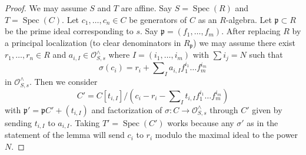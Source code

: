 \documentclass[10pt,a4paper]{amsart}
\theoremstyle{plain}
\theoremstyle{definition}
\theoremstyle{remark}
\numberwithin{equation}{subsection}
\def\Spec{\mathop{\mathrm{Spec}}}
\begin{document}
\begin{proof}
We may assume $S$ and $T$ are affine. Say $S = \Spec(R)$ and
$T = \Spec(C)$. Let $c_1, \ldots, c_n \in C$ be generators
of $C$ as an $R$-algebra. Let $\mathfrak p \subset R$ be the
prime ideal corresponding to $s$. Say $\mathfrak p = (f_1, \ldots, f_m)$.
After replacing $R$ by a principal localization
(to clear denominators in $R_\mathfrak p$)
we may assume there exist
$r_1, \ldots, r_n \in R$ and $a_{i, I} \in \mathcal{O}_{S, s}^\wedge$
where $I = (i_1, \ldots, i_m)$ with $\sum i_j = N$ such that
$$
\sigma(c_i) = r_i + \sum\nolimits_I a_{i, I} f_1^{i_1} \ldots f_m^{i_m}
$$
in $\mathcal{O}_{S, s}^\wedge$. Then we consider
$$
C' = C[t_{i, I}]/
\left(c_i - r_i - \sum\nolimits_I t_{i, I} f_1^{i_1} \ldots f_m^{i_m}\right)
$$
with $\mathfrak p' = \mathfrak pC' + (t_{i, I})$ and factorization
of $\sigma : C \to \mathcal{O}_{S, s}^\wedge$ through $C'$
given by sending $t_{i, I}$ to $a_{i, I}$.
Taking $T' = \Spec(C')$ works because any $\sigma'$ as in the statement
of the lemma will send $c_i$ to $r_i$ modulo the maximal ideal
to the power $N$.
\end{proof}
\end{document}
